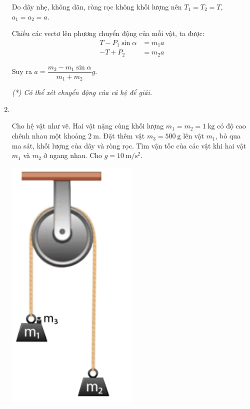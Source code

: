 \begin{enumerate}[label=\bfseries Bài \arabic*:]
{	Do dây nhẹ, không dãn, ròng rọc không khối lượng nên $T_1 = T_2 = T$, $a_1 = a_2 = a$.
	
	Chiếu các vectơ lên phương chuyển động của mỗi vật, ta được:
	\begin{align*}
		T - P_1 \sin \alpha &= m_1 a \\
		-T + P_2 &= m_2 a
	\end{align*}
	
	Suy ra $a=\dfrac{m_2 - m_1 \sin \alpha}{m_1 + m_2}g$.
	
	\textit{(*) Có thể xét chuyển động của cả hệ để giải.}
}

\item{}\\
{\begin{minipage}[l]{0.7\textwidth}
		Cho hệ vật như vẽ. Hai vật nặng cùng khối lượng $m_1=m_2=\SI{1}{\kilogram}$ có độ cao chênh nhau một khoảng $\SI{2}{\meter}$. Đặt thêm vật $m_3=\SI{500}{\gram}$ lên vật $m_1$, bỏ qua ma sát, khối lượng của dây và ròng rọc. Tìm vận tốc của các vật khi hai vật $m_1$ và $m_2$ ở ngang nhau. Cho $g=\SI{10}{\meter/\second^2}$.
	\end{minipage}
	\begin{minipage}{0.3\textwidth}
		\begin{center}
			\includegraphics[width=0.3\linewidth]{../figs/VN10-2022-PH-TP021-P-1}
		\end{center}
	\end{minipage}
}
\end{enumerate}
